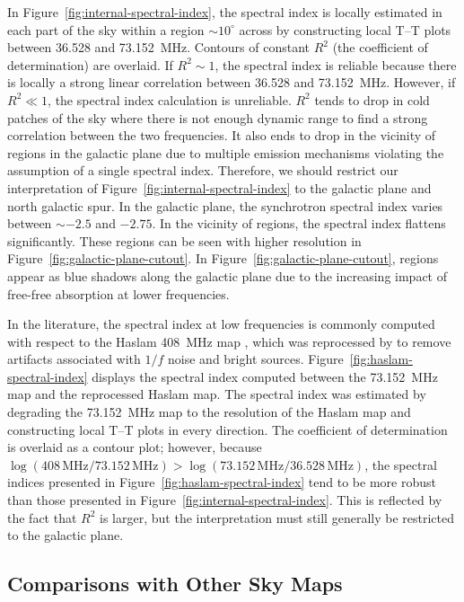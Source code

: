 \begin{bibunit}
In Figure~\ref{fig:internal-spectral-index}, the spectral index is locally estimated in each part of
the sky within a region $\sim10^\circ$ across by constructing local T--T plots between 36.528 and
73.152~MHz. Contours of constant $R^2$ (the coefficient of determination) are overlaid. If $R^2\sim
1$, the spectral index is reliable because there is locally a strong linear correlation between
36.528 and 73.152~MHz. However, if $R^2\ll 1$, the spectral index calculation is unreliable.  $R^2$
tends to drop in cold patches of the sky where there is not enough dynamic range to find a strong
correlation between the two frequencies. It also  ends to drop in the vicinity of  regions
in the galactic plane due to multiple emission mechanisms violating the assumption of a single
spectral index. Therefore, we should restrict our interpretation of
Figure~\ref{fig:internal-spectral-index} to the galactic plane and north galactic spur. In the
galactic plane, the synchrotron spectral index varies between $\sim-2.5$ and $-2.75$. In the
vicinity of  regions, the spectral index flattens significantly.  These  regions
can be seen with higher resolution in Figure~\ref{fig:galactic-plane-cutout}. In
Figure~\ref{fig:galactic-plane-cutout},  regions appear as blue shadows along the galactic
plane due to the increasing impact of free-free absorption at lower frequencies.

In the literature, the spectral index at low frequencies is commonly computed with respect to the
Haslam 408~MHz map \citep{1981A&A...100..209H, 1982A&AS...47....1H}, which was reprocessed by
\citet{2015MNRAS.451.4311R} to remove artifacts associated with $1/f$ noise and bright sources.
Figure~\ref{fig:haslam-spectral-index} displays the spectral index computed between the 73.152~MHz
map and the reprocessed Haslam map. The spectral index was estimated by degrading the 73.152~MHz map
to the resolution of the Haslam map and constructing local T--T plots in every direction. The
coefficient of determination is overlaid as a contour plot; however, because
$\log(408\,\text{MHz}/73.152\,\text{MHz}) > \log(73.152\,\text{MHz}/36.528\,\text{MHz})$, the
spectral indices presented in Figure~\ref{fig:haslam-spectral-index} tend to be more robust than
those presented in Figure~\ref{fig:internal-spectral-index}. This is reflected by the fact that
$R^2$ is larger, but the interpretation must still generally be restricted to the galactic plane.

\subsection{Comparisons with Other Sky Maps}\label{sec:compare}


\end{bibunit}
